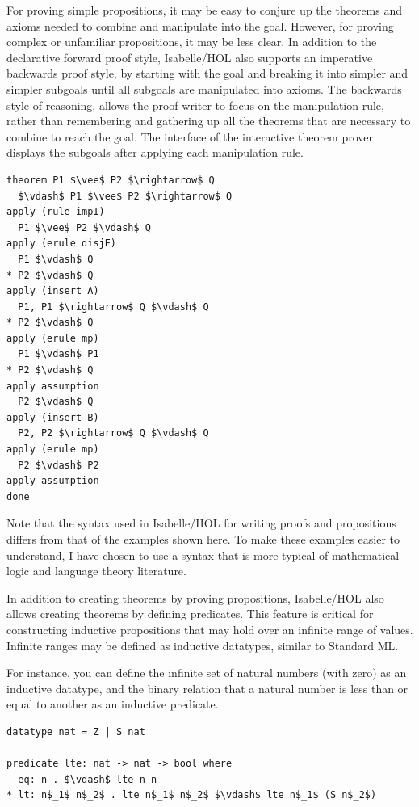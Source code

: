 \documentclass[letterpaper, 11pt]{extarticle}
\begin{document}
For proving simple propositions, it may be easy to conjure up the theorems and axioms needed to
combine and manipulate into the goal. However, for proving complex or unfamiliar propositions,
it may be less clear. In addition to the declarative forward proof style, Isabelle/HOL also
supports an imperative backwards proof style, by starting with the goal and breaking it into simpler
and simpler subgoals until all subgoals are manipulated into axioms. The backwards style of reasoning,
allows the proof
writer to focus on the manipulation rule, rather than remembering and gathering up all the theorems that are
necessary to combine to reach the goal. The interface of the interactive theorem prover displays the subgoals
after applying each manipulation rule.


\begin{lstlisting}[language=logic, mathescape]
theorem P1 $\vee$ P2 $\rightarrow$ Q
  $\vdash$ P1 $\vee$ P2 $\rightarrow$ Q
apply (rule impI)
  P1 $\vee$ P2 $\vdash$ Q
apply (erule disjE)
  P1 $\vdash$ Q
* P2 $\vdash$ Q
apply (insert A)
  P1, P1 $\rightarrow$ Q $\vdash$ Q
* P2 $\vdash$ Q
apply (erule mp)
  P1 $\vdash$ P1
* P2 $\vdash$ Q
apply assumption 
  P2 $\vdash$ Q
apply (insert B)
  P2, P2 $\rightarrow$ Q $\vdash$ Q
apply (erule mp)
  P2 $\vdash$ P2
apply assumption 
done
\end{lstlisting}

Note that the syntax used in Isabelle/HOL for writing proofs and propositions differs from
that of the examples shown here. To make these examples easier to understand, I have chosen
to use a syntax that is more typical of mathematical logic and language theory literature.  

In addition to creating theorems by proving propositions, Isabelle/HOL also allows creating theorems
by defining predicates. This feature is critical for constructing inductive propositions that may hold
over an infinite range of values. Infinite ranges may be defined as inductive datatypes,
similar to Standard ML.

For instance, you can define the infinite set of natural numbers (with zero) as an inductive datatype,
and the binary relation that a natural number is less than or equal to another as an inductive predicate.

\begin{lstlisting}[language=logic]
datatype nat = Z | S nat

predicate lte: nat -> nat -> bool where
  eq: n . $\vdash$ lte n n
* lt: n$_1$ n$_2$ . lte n$_1$ n$_2$ $\vdash$ lte n$_1$ (S n$_2$)
\end{lstlisting}
\end{document}

